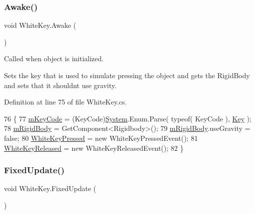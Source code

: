 \subsubsection{\texorpdfstring{Awake()}{Awake()}}
{\footnotesize\ttfamily void White\+Key.\+Awake (\begin{DoxyParamCaption}{ }\end{DoxyParamCaption})\hspace{0.3cm}{\ttfamily [private]}}



Called when object is initialized. 

Sets the key that is used to simulate pressing the object and gets the Rigid\+Body and sets that it shouldn\textquotesingle{}t use gravity. 

Definition at line 75 of file White\+Key.\+cs.


\begin{DoxyCode}
76     \{
77         \hyperlink{group___white_key_priv_var_gaeb8c5eafd138c45894858554f739eaf7}{mKeyCode} = (KeyCode)\hyperlink{namespace_system}{System}.Enum.Parse( typeof( KeyCode ), 
      \hyperlink{group___white_key_pub_var_gab24447e9dd54dbb443a0869b954fef66}{Key} );
78         \hyperlink{group___white_key_priv_var_gadc6bd637ef5229f7519b213f038ca15d}{mRigidBody} = GetComponent<Rigidbody>();
79         \hyperlink{group___white_key_priv_var_gadc6bd637ef5229f7519b213f038ca15d}{mRigidBody}.useGravity = \textcolor{keyword}{false};
80         \hyperlink{group___white_key_events_gab84691fc1e9f7b62884589d1813433e2}{WhiteKeyPressed} = \textcolor{keyword}{new} WhiteKeyPressedEvent();
81         \hyperlink{group___white_key_events_ga180e88cd7ab95af43231f53469e87830}{WhiteKeyReleased} = \textcolor{keyword}{new} WhiteKeyReleasedEvent();
82     \}
\end{DoxyCode}
\mbox{\label{group___white_key_unity_ga54ddd22238f4a46b2824eacb90430245}} 
\subsubsection{\texorpdfstring{Fixed\+Update()}{FixedUpdate()}}
{\footnotesize\ttfamily void White\+Key.\+Fixed\+Update (\begin{DoxyParamCaption}{ }\end{DoxyParamCaption})\hspace{0.3cm}{\ttfamily [private]}}



